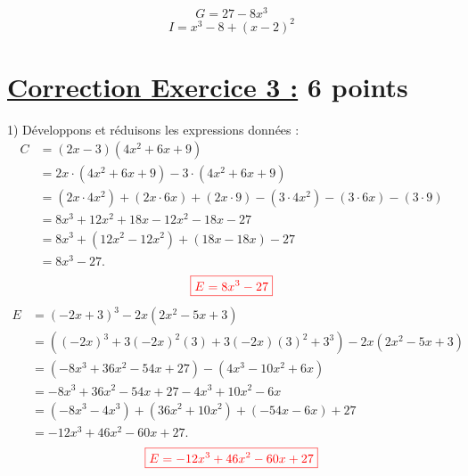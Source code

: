 \documentclass[12pt,a4paper]{article}
\begin{document}
\[
G = 27 - 8x^3
\]
\[
I = x^3 - 8 + (x - 2)^2
\]

\section*{\underline{Correction Exercice 3 :} 6 points}
1) Développons et réduisons les expressions données :
\begin{align*}
C &= (2x - 3)(4x^2 + 6x + 9) \\ 
  &= 2x \cdot (4x^2 + 6x + 9) - 3 \cdot (4x^2 + 6x + 9) \\ 
  &= (2x \cdot 4x^2) + (2x \cdot 6x) + (2x \cdot 9) - (3 \cdot 4x^2) - (3 \cdot 6x) - (3 \cdot 9) \\ 
  &= 8x^3 + 12x^2 + 18x - 12x^2 - 18x - 27 \\ 
  &= 8x^3 + (12x^2 - 12x^2) + (18x - 18x) - 27 \\ 
  &= 8x^3 - 27.
\end{align*}
$$\textcolor{red}{\boxed{E=8x^3 - 27}}$$
\begin{align*}
E &= (-2x + 3)^3 - 2x(2x^2 - 5x + 3) \\ 
  &= \left((-2x)^3 + 3(-2x)^2(3) + 3(-2x)(3)^2 + 3^3\right) - 2x(2x^2 - 5x + 3) \\ 
  &= \left(-8x^3 + 36x^2 - 54x + 27\right) - \left(4x^3 - 10x^2 + 6x\right) \\ 
  &= -8x^3 + 36x^2 - 54x + 27 - 4x^3 + 10x^2 - 6x \\ 
  &= (-8x^3 - 4x^3) + (36x^2 + 10x^2) + (-54x - 6x) + 27 \\ 
  &= -12x^3 + 46x^2 - 60x + 27.
\end{align*}
$$\textcolor{red}{\boxed{E=-12x^3 + 46x^2 - 60x + 27}}$$
\end{document}
